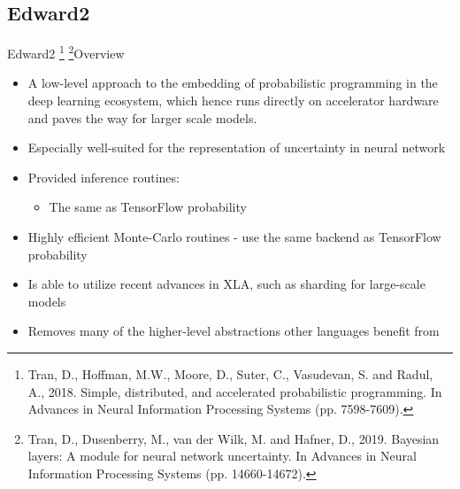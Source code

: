 \documentclass[AERbeamer%
              ,optEnglish%
              ,optBiber%
              ,optBibstyleAlphabetic%
              ,optBeamerClassicFormat%
              ]{AERlatex}%
\begin{document}
\subsection{Edward2}
\begin{frame}[c]{Edward2 \footnote{Tran, D., Hoffman, M.W., Moore, D., Suter, C., Vasudevan, S. and Radul, A., 2018. Simple, distributed,
                                   and accelerated probabilistic programming. In Advances in Neural Information Processing Systems (pp. 7598-7609).}
                         \footnote{Tran, D., Dusenberry, M., van der Wilk, M. and Hafner, D., 2019. Bayesian layers: A module for neural network
                                   uncertainty. In Advances in Neural Information Processing Systems (pp. 14660-14672).}}{Overview}
    \centering
    \begin{itemize}
        \item A low-level approach to the embedding of probabilistic programming in the deep learning ecosystem, which
              hence runs directly on accelerator hardware and paves the way for larger scale models.
        \item Especially well-suited for the representation of uncertainty in neural network
        \item Provided inference routines:
        \begin{itemize}
            \item The same as TensorFlow probability
        \end{itemize}
        \item Highly efficient Monte-Carlo routines - use the same backend as TensorFlow probability
        \item Is able to utilize recent advances in XLA, such as sharding for large-scale models
        \item Removes many of the higher-level abstractions other languages benefit from
    \end{itemize}
\end{frame}
\end{document}
